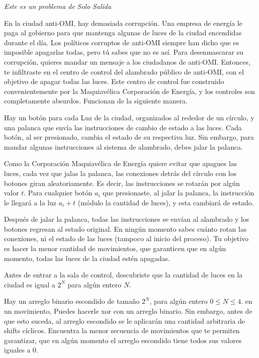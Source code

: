 \documentclass[12pt]{scrartcl}
\begin{document}
    
    {\itshape Este es un problema de Solo Salida}
    
    \vspace{10pt}

    En la ciudad anti-OMI, hay demasiada corrupción. Una empresa de energía le paga al gobierno para que mantenga algunas de luces de la ciudad encendidas durante el día. Los políticos corruptos de anti-OMI siempre han dicho que es imposible apagarlas todas, pero tú sabes que no es así. Para desenmascarar su corrupción, quieres mandar un mensaje a los ciudadanos de anti-OMI. Entonces, te infiltraste en el centro de control del alambrado público de anti-OMI, con el objetivo de apagar todas las luces. Este centro de control fue construido convenientemente por la Maquiavélica Corporación de Energía, y los controles son completamente absurdos. Funcionan de la siguiente manera.
    
    Hay un botón para cada Luz de la ciudad, organizados al rededor de un círculo, y una palanca que envía las instrucciones de cambio de estado a las luces. Cada botón, al ser presionado, cambia el estado de su respectiva luz. Sin embargo, para mandar algunas instrucciones al sistema de alambrado, debes jalar la palanca. 
    
    Como la Corporación Maquiavélica de Energía quiere evitar que apagues las luces, cada vez que jalas la palanca, las conexiones detrás del círculo con los botones giran aleatoriamente. Es decir, las instrucciones se rotarán por algún valor $t$. Para cualquier botón $a_i$ que presionaste, al jalar la palanca, la instrucción le llegará a la luz $a_i + t$ (módulo la cantidad de luces), y esta cambiará de estado.
    
    Después de jalar la palanca, todas las instrucciones se envían al alambrado y los botones regresan al estado original. En ningún momento sabes cuánto rotan las conexiones, ni el estado de las luces (tampoco al inicio del proceso). Tu objetivo es hacer la menor cantidad de movimientos, que garanticen que en algún momento, todas las luces de la ciudad estén apagadas. 

    Antes de entrar a la sala de control, descubriste que la cantidad de luces en la ciudad es igual a $2^{N}$ para algún entero $N$.


    Hay un arreglo binario escondido de tamaño $2^{N}$, para algún entero $0 \le N \le 4$. en un movimiento, Puedes hacerle xor con un arreglo binario. Sin embargo, antes de que esto suceda, al arreglo escondido se le aplicarán una cantidad arbitraria de shifts cíclicos. Encuentra la menor secuencia de movimientos que te permiten garantizar, que en algún momento el arreglo escondido tiene todos sus valores iguales a 0.
\end{document}
